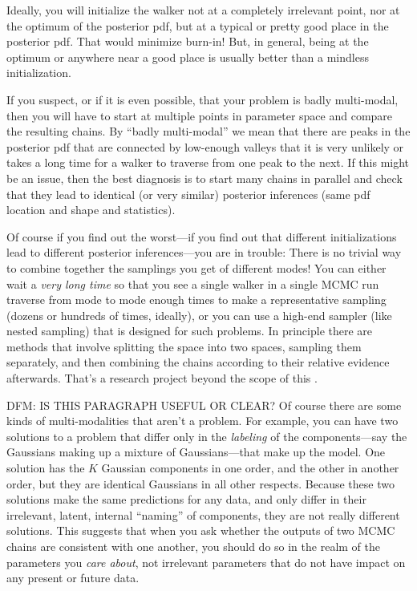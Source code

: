 \documentclass[12pt,twoside,pdftex]{article}
\begin{document}
Ideally, you will initialize the walker not at a completely irrelevant
point, nor at the optimum of the posterior pdf, but at a typical or
pretty good place in the posterior pdf.
That would minimize burn-in!
But, in general, being at the optimum or anywhere near a good place is
usually better than a mindless initialization.

If you suspect, or if it is even possible, that your problem is badly
multi-modal, then you will have to start at multiple points in
parameter space and compare the resulting chains.
By ``badly multi-modal'' we mean that there are peaks in the posterior
pdf that are connected by low-enough valleys that it is very unlikely
or takes a long time for a walker to traverse from one peak to the
next.
If this might be an issue, then the best diagnosis is to start many
chains in parallel and check that they lead to identical (or very
similar) posterior inferences (same pdf location and shape and
statistics).

Of course if you find out the worst---if you find out that different
initializations lead to different posterior inferences---you are in
trouble:
There is no trivial way to combine together the samplings you get of
different modes!
You can either wait a \emph{very long time} so that you see a single
walker in a single MCMC run traverse from mode to mode enough times to
make a representative sampling (dozens or hundreds of times, ideally),
or you can use a high-end sampler (like nested sampling) that is
designed for such problems.
In principle there are methods that involve splitting the space into
two spaces, sampling them separately, and then combining the chains
according to their relative evidence afterwards.
That's a research project beyond the scope of this \documentname.

DFM: IS THIS PARAGRAPH USEFUL OR CLEAR?
Of course there are some kinds of multi-modalities that aren't a
problem.
For example, you can have two solutions to a problem that differ only
in the \emph{labeling} of the components---say the Gaussians making up
a mixture of Gaussians---that make up the model.
One solution has the $K$ Gaussian components in one order, and the
other in another order, but they are identical Gaussians in all
other respects.
Because these two solutions make the same predictions for any data, and
only differ in their irrelevant, latent, internal ``naming'' of components,
they are not really different solutions.
This suggests that when you ask whether the outputs of two MCMC chains
are consistent with one another, you should do so in the realm of the
parameters you \emph{care about}, not irrelevant parameters that do
not have impact on any present or future data.
\end{document}
